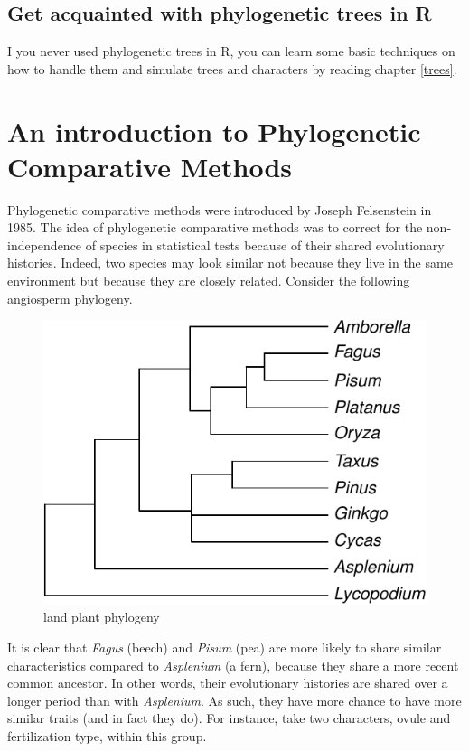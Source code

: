 \documentclass[
]{book}
\begin{document}
\section{Get acquainted with phylogenetic trees in R}\label{get-acquainted-with-phylogenetic-trees-in-r}

I you never used phylogenetic trees in R, you can learn some basic techniques on how to handle them and simulate trees and characters by reading chapter \ref{trees}.

\chapter{An introduction to Phylogenetic Comparative Methods}\label{intro}

Phylogenetic comparative methods were introduced by Joseph Felsenstein in 1985. The idea of phylogenetic comparative methods was to correct for the non-independence of species in statistical tests because of their shared evolutionary histories. Indeed, two species may look similar not because they live in the same environment but because they are closely related. Consider the following angiosperm phylogeny.

\begin{figure}

{\centering \includegraphics{pcm-workshop_files/figure-latex/AngiospermTree-1} 

}

\caption{land plant phylogeny}\label{fig:AngiospermTree}
\end{figure}

It is clear that \emph{Fagus} (beech) and \emph{Pisum} (pea) are more likely to share similar characteristics compared to \emph{Asplenium} (a fern), because they share a more recent common ancestor. In other words, their evolutionary histories are shared over a longer period than with \emph{Asplenium}. As such, they have more chance to have more similar traits (and in fact they do). For instance, take two characters, ovule and fertilization type, within this group.
\end{document}
